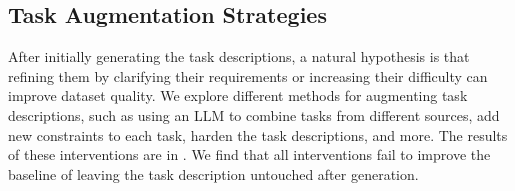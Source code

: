 \documentclass{article}
\begin{document}
\begin{table}[!htbp]
\centering
{}
\vspace{10pt}
\caption{\textbf{Mixing top-ranked task generation strategies, random shuffle within task.} Mixing the top-4 to top-8 strategies yields the strongest balanced performance, outperforming the unmixed top-1 baseline by avoiding over-specialization. }
\label{tab:mixing_strategies}
\end{table}
\FloatBarrier

\subsection{Task Augmentation Strategies}
\label{sec:task_augmentation}

After initially generating the task descriptions, a natural hypothesis is that refining them by clarifying their requirements or increasing their difficulty can improve dataset quality. We explore different methods for augmenting task descriptions, such as using an LLM to combine tasks from different sources, add new constraints to each task, harden the task descriptions, and more. The results of these interventions are in . We find that all interventions fail to improve the baseline of leaving the task description untouched after generation.
\end{document}
